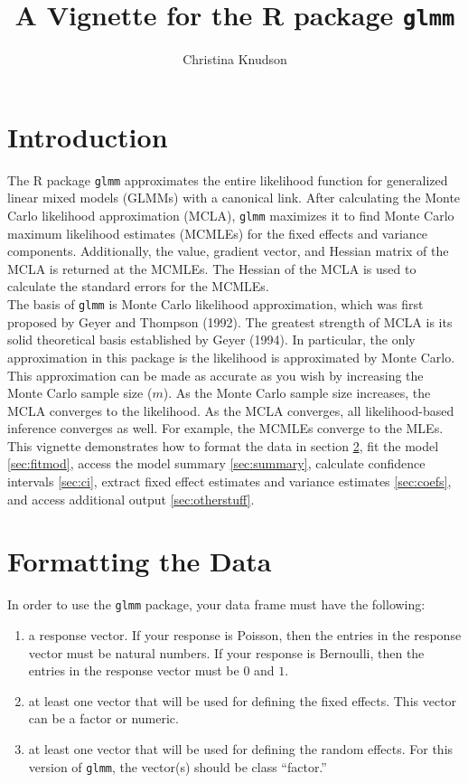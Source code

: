 \documentclass[11pt]{article}\usepackage[]{graphicx}\usepackage[]{color}
\title{A Vignette for the R package \texttt{glmm} }
\author{Christina Knudson}
\begin{document}
\maketitle
\setlength\parindent{0pt}

\section{Introduction}
The R package \texttt{glmm} approximates the entire likelihood function for generalized linear mixed models (GLMMs) with a canonical link. After calculating the Monte Carlo likelihood approximation (MCLA), \texttt{glmm} maximizes it to find Monte Carlo maximum likelihood estimates (MCMLEs) for the fixed effects and variance components. Additionally, the value, gradient vector, and Hessian matrix of the MCLA is returned at the MCMLEs. The Hessian of the MCLA is used to calculate the standard errors for the MCMLEs. \\

The basis of \texttt{glmm} is Monte Carlo likelihood approximation, which was first proposed by Geyer and Thompson (1992).   The greatest strength of MCLA is its solid theoretical basis established by Geyer (1994). In particular, the only approximation in this package is the likelihood is approximated by Monte Carlo. This approximation can be made as accurate as you wish by increasing the Monte Carlo sample size ($m$). As the Monte Carlo sample size increases, the MCLA converges to the likelihood. As the MCLA converges, all likelihood-based inference converges as well. For example, the MCMLEs converge to the MLEs.\\

This vignette demonstrates how to format the data in section \ref{sec:format}, fit the model \ref{sec:fitmod}, access the model summary \ref{sec:summary}, calculate confidence intervals \ref{sec:ci}, extract fixed effect estimates and variance estimates \ref{sec:coefs}, and access additional output \ref{sec:otherstuff}. \\




\section {Formatting the Data}\label{sec:format}

 In order to use the \texttt{glmm} package, your data frame must have the following:
\begin{enumerate}
\item a response vector. If your response is Poisson, then the entries in the response vector must be natural numbers. If your response is Bernoulli, then the entries in the response vector must be $0$ and $1$.
\item at least one vector that will be used for defining the fixed effects. This vector can be a factor or numeric.
\item at least one vector that will be used for defining the random effects. For this version of \texttt{glmm}, the vector(s) should be class ``factor.''
\end{enumerate}
\end{document}
